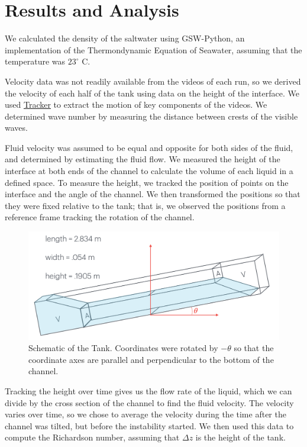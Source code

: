 \documentclass{article}
\begin{document}
\section{Results and Analysis}

We calculated the density of the saltwater using GSW-Python, an implementation
of the Thermondynamic Equation of Seawater, assuming that the temperature was
\(23^\circ\) C.

Velocity data was not readily available from the videos of each run, so we
derived the velocity of each half of the tank using data on the height of the
interface. We used \href{https://physlets.org/tracker/}{Tracker} to extract the
motion of key components of the videos. We determined wave number by measuring
the distance between crests of the visible waves.

Fluid velocity was assumed to be equal and opposite for both sides of the fluid,
and determined by estimating the fluid flow. We measured the height of the
interface at both ends of the channel to calculate the volume of each liquid in
a defined space. To measure the height, we tracked the position of points on the
interface and the angle of the channel. We then transformed the positions so
that they were fixed relative to the tank; that is, we observed the positions
from a reference frame tracking the rotation of the channel.
\begin{figure}[h]
    \centering
    \includegraphics[width=5in]{tank-schematic.png}
    \caption{Schematic of the Tank. Coordinates were rotated by $-\theta$ so that the coordinate axes are parallel and perpendicular to the bottom of the channel.}
    \label{img:tank-schematic}
\end{figure}
Tracking the height over time gives us the flow rate of the liquid, which we can
divide by the cross section of the channel to find the fluid velocity. The
velocity varies over time, so we chose to average the velocity during the time
after the channel was tilted, but before the instability started. We then used
this data to compute the Richardson number, assuming that \(\Delta z\) is the
height of the tank.
\end{document}
